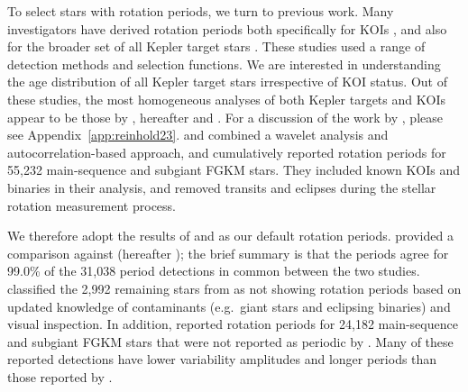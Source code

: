 \documentclass[11pt,twocolumn,tighten,linenumbers,trackchanges]{aastex63}
\begin{document}
To select stars with rotation periods, we turn to previous work.  Many
investigators have derived rotation periods both specifically for KOIs
\citep{McQuillan_2013,Walkowicz_2013,Mazeh_2015,Angus_2018,David_2021},
and also for the broader set of all Kepler target stars
\citep{McQuillan_2014,Reinhold_2015,Santos_2019,Santos_2021,Reinhold2023}.
These studies used a range of detection methods and selection
functions.  We are interested in understanding the age distribution of
all Kepler target stars irrespective of KOI status.  Out of these
studies, the most homogeneous analyses of both Kepler
targets and KOIs appear to be those by
\citet{Santos_2019,Santos_2021}, hereafter 
and .  For a discussion of the work by
\citet{Reinhold2023}, please see Appendix~\ref{app:reinhold23}.
 and  combined a
wavelet analysis and autocorrelation-based approach, and cumulatively
reported rotation periods for 55{,}232 main-sequence and subgiant FGKM
stars.  They included known KOIs and binaries in their analysis, and
removed transits and eclipses during the stellar rotation measurement
process. 

We therefore adopt the results of  and
 as our default rotation periods.
 provided a comparison against
\citet{McQuillan_2014} (hereafter ); the brief summary is that the periods
agree for 99.0\% of the 31{,}038 period detections in common between
the two studies.   classified the 2{,}992
remaining stars from  as not showing
rotation periods based on updated knowledge of contaminants
(e.g.~giant stars and eclipsing binaries) and visual inspection.  In
addition,  reported rotation periods for
24{,}182 main-sequence and subgiant FGKM stars that were not reported
as periodic by .  Many of these reported
detections have lower variability amplitudes and longer periods than
those reported by . 
\end{document}
